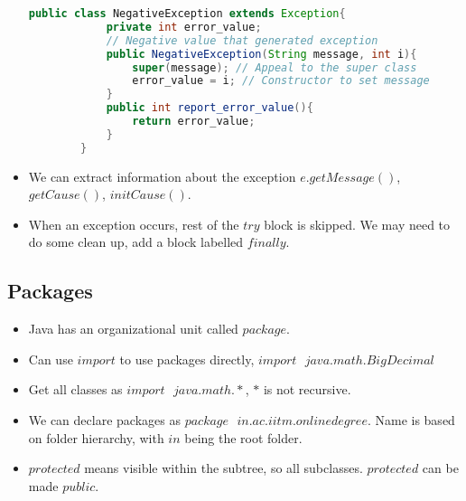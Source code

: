 \documentclass[a4paper]{article}
\begin{document}
\begin{itemize}
\begin{lstlisting}[language=Java]
        public class NegativeException extends Exception{
            private int error_value;
            // Negative value that generated exception
            public NegativeException(String message, int i){
                super(message); // Appeal to the super class
                error_value = i; // Constructor to set message
            }
            public int report_error_value(){
                return error_value;
            }
        }
    \end{lstlisting}
    \item We can extract information about the exception $e.getMessage()$, $getCause()$, $initCause()$.
    \item When an exception occurs, rest of the $try$ block is skipped. We may need to do some clean up, add a block labelled $finally$.
\end{itemize}

\subsection{Packages}
\begin{itemize}
    \item Java has an organizational unit called $package$.
    \item Can use $import$ to use packages directly, $import\text{ }java.math.BigDecimal$
    \item Get all classes as $import\text{ }java.math.*$, $*$ is not recursive.
    \item We can declare packages as $package\text{ }in.ac.iitm.onlinedegree$. Name is based on folder hierarchy, with $in$ being the root folder.
    \item $protected$ means visible within the subtree, so all subclasses. $protected$ can be made $public$.
\end{itemize}
\end{document}
